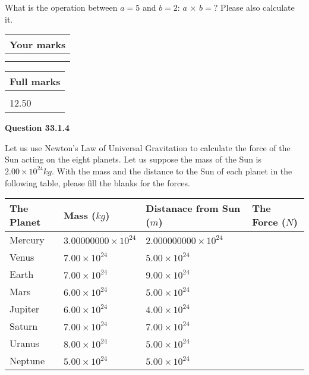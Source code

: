 \documentclass[12pt]{article}
\begin{document}
  
What is the operation between $a= %
5$ and $b= %
2$:
$a$  %
$\times$ $b=?$ Please also calculate it.

 
\vspace{0.3in}
  
\vspace{0.2in}
  
         \begin{tabular}{|l|}
\hline
 Your marks  \\
\hline
 \\ 
 \\ 
\hline
\end{tabular}
\hspace{0.05in} \begin{tabular}{|l|}
\hline
 Full marks  \\
\hline
 \\ 
12.50 \\
\hline
\end{tabular}
{\textbf{\Large{Question
33.1.4 
}}}
  
  
Let us use Newton's Law of Universal Gravitation to calculate the force
of the Sun acting on the eight planets. Let us suppose the mass of the
Sun is $ %
2.00 \times 10^{24} kg$. With the mass and the
distance to the Sun of each planet in the following table, please fill
the blanks for the forces.
 
\vspace{0.2in}
 
 
\begin{tabular}{|l|l|l|l|}
\hline
The Planet & Mass ($kg$) & Distanace from Sun ($m$) & The Force ($N$)\\
\hline
Mercury  &
           $ %
3.00000000 \times 10^{24} $   &
             $ %
2.000000000 \times 10^{24} $    &
\\  \hline
Venus    &
           $ %
7.00 \times 10^{24} $    &
             $ %
5.00 \times 10^{24} $    &
\\  \hline
Earth    &
           $ %
7.00 \times 10^{24} $    &
             $ %
9.00 \times 10^{24} $    &
\\   \hline
Mars     &
           $ %
6.00 \times 10^{24} $    &
             $ %
5.00 \times 10^{24} $    &
\\   \hline
Jupiter  &
           $ %
6.00 \times 10^{24} $    &
             $ %
4.00 \times 10^{24} $    &
\\  \hline
Saturn   &
           $ %
7.00 \times 10^{24}$    &
             $ %
7.00 \times 10^{24}$    &
\\  \hline
Uranus   &
           $ %
8.00 \times 10^{24} $    &
             $ %
5.00 \times 10^{24} $    &
\\  \hline
Neptune  &
           $ %
5.00 \times 10^{24} $    &
             $ %
5.00 \times 10^{24} $    &
\\  \hline
 
\end{tabular}
 
\end{document}
